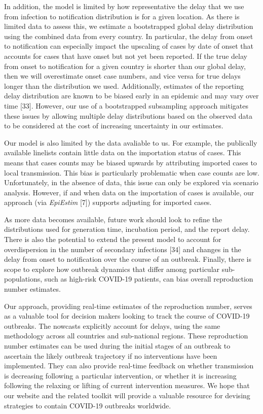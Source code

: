 \documentclass[]{article}
\begin{document}
In addition, the model is limited by how representative the delay that
we use from infection to notification distribution is for a given
location. As there is limited data to assess this, we estimate a
bootstrapped global delay distribution using the combined data from
every country. In particular, the delay from onset to notification can
especially impact the upscaling of cases by date of onset that accounts
for cases that have onset but not yet been reported. If the true delay
from onset to notification for a given country is shorter than our
global delay, then we will overestimate onset case numbers, and vice
versa for true delays longer than the distribution we used.
Additionally, estimates of the reporting delay distribution are known to
be biased early in an epidemic and may vary over time {[}33{]}. However,
our use of a bootstrapped subsampling approach mitigates these issues by
allowing multiple delay distributions based on the observed data to be
considered at the cost of increasing uncertainty in our estimates.

Our model is also limited by the data avaliable to us. For example, the
publically available linelists contain little data on the importation
status of cases. This means that cases counts may be biased upwards by
attributing imported cases to local transmission. This bias is
particularly problematic when case counts are low. Unfortunately, in the
absence of data, this issue can only be explored via scenario analysis.
However, if and when data on the importation of cases is available, our
approach (via \emph{EpiEstim} {[}7{]}) supports adjusting for imported
cases.

As more data becomes available, future work should look to refine the
distributions used for generation time, incubation period, and the
report delay. There is also the potential to extend the present model to
account for overdispersion in the number of secondary infections
{[}34{]} and changes in the delay from onset to notification over the
course of an outbreak. Finally, there is scope to explore how outbreak
dynamics that differ among particular sub-populations, such as high-risk
COVID-19 patients, can bias overall reproduction number estimates.

Our approach, providing real-time estimates of the reproduction number,
serves as a valuable tool for decision makers looking to track the
course of COVID-19 outbreaks. The nowcasts explicitly account for
delays, using the same methodology across all countries and sub-national
regions. These reproduction number estimates can be used during the
initial stages of an outbreak to ascertain the likely outbreak
trajectory if no interventions have been implemented. They can also
provide real-time feedback on whether transmission is decreasing
following a particular intervention, or whether it is increasing
following the relaxing or lifting of current intervention measures. We
hope that our website and the related toolkit will provide a valuable
resource for devising strategies to contain COVID-19 outbreaks
worldwide.
\end{document}
